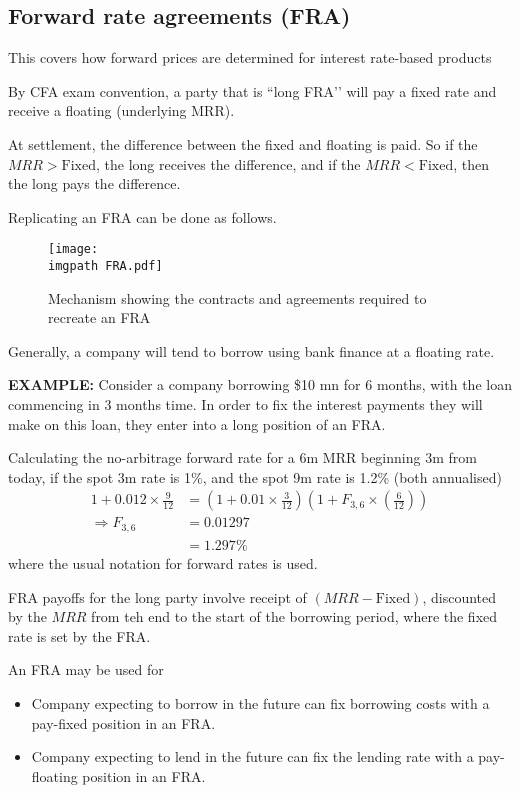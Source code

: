 \documentclass[../notes_compiled.tex]{subfiles}
\begin{document}
\subsection{Forward rate agreements (FRA)}
\begin{itemize}
\item This covers how forward prices are determined for interest rate-based products
\item By CFA exam convention, a party that is ``long FRA’’ will pay a fixed rate and receive a floating (underlying MRR).
\item At settlement, the difference between the fixed and floating is paid. So if the $MRR > \text{Fixed}$, the long receives the difference, and if the $MRR < \text{Fixed}$, then the long pays the difference.
\item Replicating an FRA can be done as follows.
\begin{figure}[h]
  \centering
  \texttt{[image: \\imgpath FRA.pdf]}
  \caption{Mechanism showing the contracts and agreements required to recreate an FRA}
\end{figure}
\item Generally, a company will tend to borrow using bank finance at a floating rate.
{\color{RedViolet}
\item[] \textbf{EXAMPLE:} Consider a company borrowing \$10 mn for 6 months, with the loan commencing in 3 months time. In order to fix the interest payments they will make on this loan, they enter into a long position of an FRA.
}
{\color{RoyalBlue}
\item[] Calculating the no-arbitrage forward rate for a 6m MRR beginning 3m from today, if the spot 3m rate is 1\%, and the spot 9m rate is 1.2\% (both annualised)
\begin{align*}
1 + 0.012 \times \frac{9}{12} &= \left( 1 + 0.01 \times \frac{3}{12} \right) \left( 1 + F_{3,6} \times \left( \frac{6}{12} \right) \right) \\
\Rightarrow F_{3,6} &= 0.01297 \\
&=1.297\%
\end{align*}
where the usual notation for forward rates is used.
}

\item FRA payoffs for the long party involve receipt of $(MRR - \text{Fixed})$, discounted by the $MRR$ from teh end to the start of the borrowing period, where the fixed rate is set by the FRA.
\item An FRA may be used for 
\begin{itemize}
\item Company expecting to borrow in the future can fix borrowing costs with a pay-fixed position in an FRA.
\item Company expecting to lend in the future can fix the lending rate with a pay-floating position in an FRA.
\end{itemize}
\end{itemize}
\end{document}
